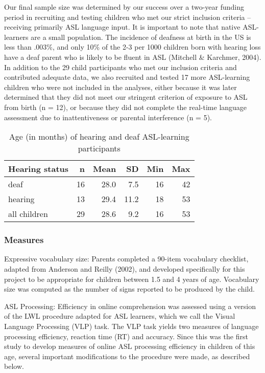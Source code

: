\documentclass[oneside]{report}
\begin{document}
Our final sample size was determined by our success over a two-year
funding period in recruiting and testing children who met our strict
inclusion criteria -- receiving primarily ASL language input. It is
important to note that native ASL-learners are a small population. The
incidence of deafness at birth in the US is less than .003\%, and only
10\% of the 2-3 per 1000 children born with hearing loss have a deaf
parent who is likely to be fluent in ASL (Mitchell \& Karchmer, 2004).
In addition to the 29 child participants who met our inclusion criteria
and contributed adequate data, we also recruited and tested 17 more
ASL-learning children who were not included in the analyses, either
because it was later determined that they did not meet our stringent
criterion of exposure to ASL from birth (n = 12), or because they did
not complete the real-time language assessment due to inattentiveness or
parental interference (n = 5).

\begingroup\fontsize{12}{14}\selectfont
\begin{longtable}[t]{lrrrrr}
\caption[Age of ASL-learning children]{\label{tab:sol-demo-table}Age (in months) of hearing and deaf ASL-learning participants}\\
\toprule
\textbf{Hearing status} & \textbf{n} & \textbf{Mean} & \textbf{SD} & \textbf{Min} & \textbf{Max}\\
\midrule
deaf & 16 & 28.0 & 7.5 & 16 & 42\\
hearing & 13 & 29.4 & 11.2 & 18 & 53\\
\hline
all children & 29 & 28.6 & 9.2 & 16 & 53\\
\bottomrule
\end{longtable}
\endgroup{}

\subsubsection{Measures}\label{measures}

Expressive vocabulary size: Parents completed a 90-item vocabulary
checklist, adapted from Anderson and Reilly (2002), and developed
specifically for this project to be appropriate for children between 1.5
and 4 years of age. Vocabulary size was computed as the number of signs
reported to be produced by the child.

ASL Processing: Efficiency in online comprehension was assessed using a
version of the LWL procedure adapted for ASL learners, which we call the
Visual Language Processing (VLP) task. The VLP task yields two measures
of language processing efficiency, reaction time (RT) and accuracy.
Since this was the first study to develop measures of online ASL
processing efficiency in children of this age, several important
modifications to the procedure were made, as described below.
\end{document}
